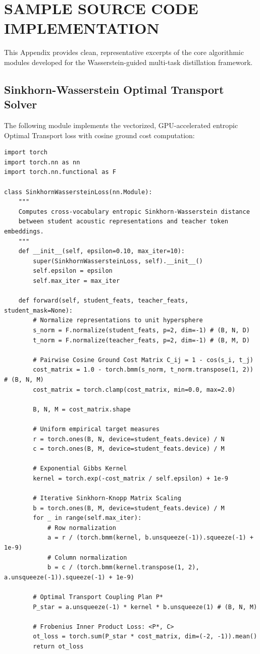 \chapter{SAMPLE SOURCE CODE IMPLEMENTATION}
\label{app:code}

This Appendix provides clean, representative excerpts of the core algorithmic modules developed for the Wasserstein-guided multi-task distillation framework.

\section{Sinkhorn-Wasserstein Optimal Transport Solver}
The following module implements the vectorized, GPU-accelerated entropic Optimal Transport loss with cosine ground cost computation:

\begin{singlespace}
\begin{verbatim}
import torch
import torch.nn as nn
import torch.nn.functional as F

class SinkhornWassersteinLoss(nn.Module):
    """
    Computes cross-vocabulary entropic Sinkhorn-Wasserstein distance
    between student acoustic representations and teacher token embeddings.
    """
    def __init__(self, epsilon=0.10, max_iter=10):
        super(SinkhornWassersteinLoss, self).__init__()
        self.epsilon = epsilon
        self.max_iter = max_iter

    def forward(self, student_feats, teacher_feats, student_mask=None):
        # Normalize representations to unit hypersphere
        s_norm = F.normalize(student_feats, p=2, dim=-1) # (B, N, D)
        t_norm = F.normalize(teacher_feats, p=2, dim=-1) # (B, M, D)

        # Pairwise Cosine Ground Cost Matrix C_ij = 1 - cos(s_i, t_j)
        cost_matrix = 1.0 - torch.bmm(s_norm, t_norm.transpose(1, 2)) # (B, N, M)
        cost_matrix = torch.clamp(cost_matrix, min=0.0, max=2.0)

        B, N, M = cost_matrix.shape

        # Uniform empirical target measures
        r = torch.ones(B, N, device=student_feats.device) / N
        c = torch.ones(B, M, device=student_feats.device) / M

        # Exponential Gibbs Kernel
        kernel = torch.exp(-cost_matrix / self.epsilon) + 1e-9

        # Iterative Sinkhorn-Knopp Matrix Scaling
        b = torch.ones(B, M, device=student_feats.device) / M
        for _ in range(self.max_iter):
            # Row normalization
            a = r / (torch.bmm(kernel, b.unsqueeze(-1)).squeeze(-1) + 1e-9)
            # Column normalization
            b = c / (torch.bmm(kernel.transpose(1, 2), a.unsqueeze(-1)).squeeze(-1) + 1e-9)

        # Optimal Transport Coupling Plan P*
        P_star = a.unsqueeze(-1) * kernel * b.unsqueeze(1) # (B, N, M)

        # Frobenius Inner Product Loss: <P*, C>
        ot_loss = torch.sum(P_star * cost_matrix, dim=(-2, -1)).mean()
        return ot_loss
\end{verbatim}
\end{singlespace}

